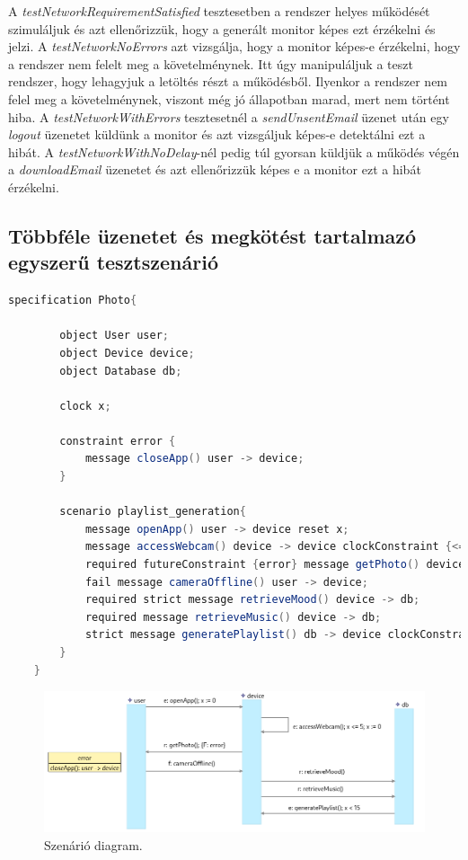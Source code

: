 A \textit{testNetworkRequirementSatisfied} tesztesetben a rendszer helyes működését szimuláljuk és azt ellenőrizzük, hogy a generált monitor képes ezt érzékelni és jelzi.
A \textit{testNetworkNoErrors} azt vizsgálja, hogy a monitor képes-e érzékelni, hogy a rendszer nem felelt meg a követelménynek.
Itt úgy manipuláljuk a teszt rendszer, hogy lehagyjuk a letöltés részt a működésből.
Ilyenkor a rendszer nem felel meg a követelménynek, viszont még jó állapotban marad, mert nem történt hiba.
A \textit{testNetworkWithErrors} tesztesetnél a \textit{sendUnsentEmail} üzenet után egy \textit{logout} üzenetet küldünk a monitor és azt vizsgáljuk képes-e detektálni ezt a hibát.
A \textit{testNetworkWithNoDelay}-nél pedig túl gyorsan küldjük a működés végén a \textit{downloadEmail} üzenetet és azt ellenőrizzük képes e a monitor ezt a hibát érzékelni.

\clearpage\subsection{Többféle üzenetet és megkötést tartalmazó egyszerű tesztszenárió}

\begin{lstlisting}[language=java, frame=single, float=ht!, caption={Integrációs teszteset.},captionpos=b]
    specification Photo{

        object User user;
        object Device device;
        object Database db;

        clock x;

        constraint error {
            message closeApp() user -> device;
        }

        scenario playlist_generation{
            message openApp() user -> device reset x;
            message accessWebcam() device -> device clockConstraint {<=(x, 5)} reset x;
            required futureConstraint {error} message getPhoto() device -> user;
            fail message cameraOffline() user -> device;
            required strict message retrieveMood() device -> db;
            required message retrieveMusic() device -> db;
            strict message generatePlaylist() db -> device clockConstraint {<(x, 15)};
        }
    }
\end{lstlisting}

\begin{figure}[!ht]
    \centering
    \includegraphics[width=150mm, keepaspectratio]{figures/diagramMobileExample.png}
    \caption{Szenárió diagram.}
\end{figure}

